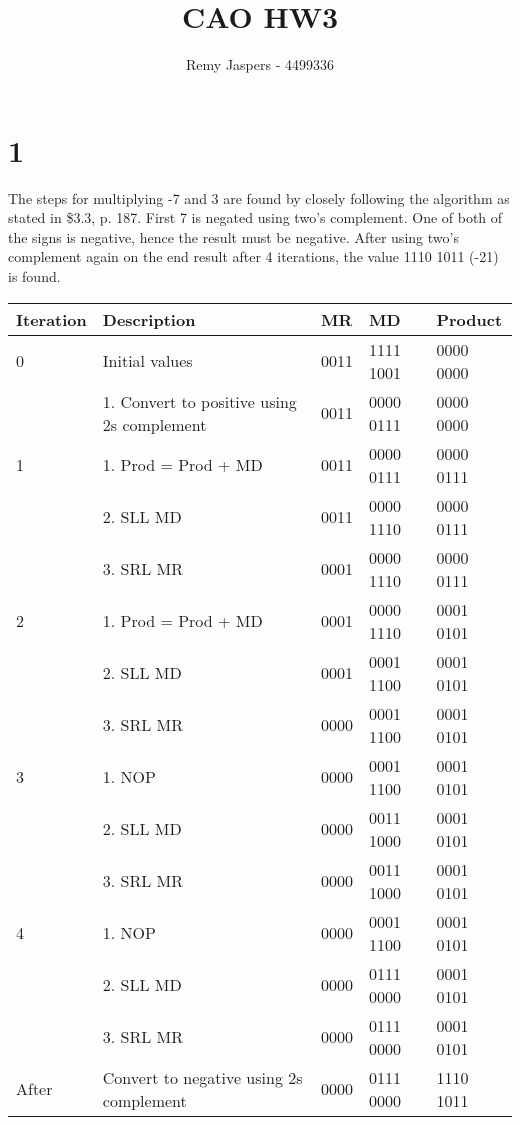 \documentclass[10pt,a4paper]{article}
\author{Remy Jaspers - 4499336}
\title{CAO HW3}
\begin{document}
	\maketitle
	\section*{1}
	The steps for multiplying -7 and 3 are found by closely following the algorithm as stated in \$3.3, p. 187. First 7 is negated using two's complement. One of both of the signs is negative, hence the result must be negative. After using two's complement again on the end result after 4 iterations, the value 1110 1011 (-21) is found.
	\begin{table}[h]
		\centering
		\label{my-label}
		\begin{tabular}{|l|l|l|l|l|}
			\hline
			Iteration & Description & MR  & MD & Product   \\ \hline
			0& Initial values  & 0011  & 1111 1001 &  0000 0000 \\ 
			& 1. Convert to positive using 2s complement & 0011 & 0000 0111 & 0000 0000 \\ \hline
			1& 1. Prod = Prod + MD &  0011  & 0000 0111 & 0000 0111 \\
			& 2. SLL MD &  0011  & 0000 1110 & 0000 0111 \\
			& 3. SRL MR &  0001  & 0000 1110 & 0000 0111 \\ \hline
			
			2 
			& 1. Prod = Prod + MD &  0001  & 0000 1110 & 0001 0101 \\
			& 2. SLL MD &  0001  & 0001 1100 & 0001 0101 \\
			& 3. SRL MR &  0000  & 0001 1100 & 0001 0101 \\ \hline
			
			3 
			& 1. NOP &  0000  & 0001 1100 & 0001 0101 \\
			& 2. SLL MD &  0000  & 0011 1000 & 0001 0101 \\
			& 3. SRL MR &  0000  & 0011 1000 & 0001 0101 \\ \hline

			4 
			& 1. NOP &  0000  & 0001 1100 & 0001 0101 \\
			& 2. SLL MD &  0000  & 0111 0000 & 0001 0101 \\
			& 3. SRL MR &  0000  & 0111 0000 & 0001 0101 \\ \hline
			

			After
			& Convert to negative using 2s complement &  0000  & 0111 0000 & 1110 1011 \\ \hline
		\end{tabular}
	\end{table}
\end{document}
